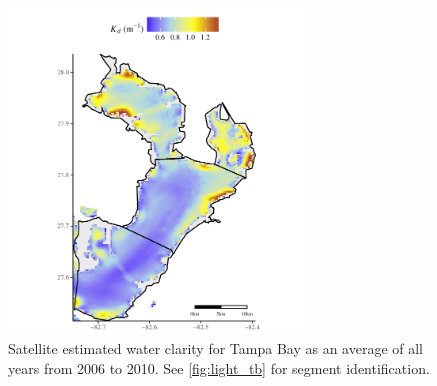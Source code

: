 \documentclass[letterpaper,12pt,oneside]{article}\usepackage[]{graphicx}\usepackage[]{color}
\begin{document}

\begin{figure}
\centering
\includegraphics[width = 0.7\textwidth]{figs/Fig6.pdf}
\caption{Satellite estimated water clarity for Tampa Bay as an average of all years from 2006 to 2010. See \cref{fig:light_tb} for segment identification.}
\label{fig:clarity_tb}
\end{figure}

\end{document}
